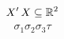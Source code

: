 \documentclass[11pt]{amsproc}
\begin{document}




$$ X' \, X \subseteq \mathbb{R}^2 $$
$$ \sigma_1 \sigma_2 \sigma_3 \tau $$
\end{document}
